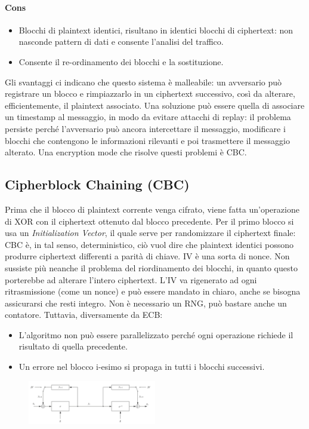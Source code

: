 \documentclass[a4paper,12pt]{article}
\begin{document}
\paragraph{Cons}
\begin{itemize}
	\item Blocchi di plaintext identici, risultano in identici blocchi di ciphertext: non nasconde pattern di dati e consente l'analisi del traffico.
	\item Consente il re-ordinamento dei blocchi e la sostituzione.
\end{itemize}
Gli svantaggi ci indicano che questo sistema è malleabile: un avversario può registrare un blocco e rimpiazzarlo in un ciphertext successivo, così da alterare, efficientemente, il plaintext associato.
Una soluzione può essere quella di associare un timestamp al messaggio, in modo da evitare attacchi di replay: il problema persiste perché l'avversario può ancora intercettare il messaggio, modificare i blocchi che contengono le informazioni rilevanti e poi trasmettere il messaggio alterato. Una encryption mode che risolve questi problemi è CBC.

\subsection{Cipherblock Chaining (CBC)}
Prima che il blocco di plaintext corrente venga cifrato, viene fatta un'operazione di XOR con il ciphertext ottenuto dal blocco precedente.
Per il primo blocco si usa un \textit{Initialization Vector}, il quale serve per randomizzare il ciphertext finale: CBC è, in tal senso, deterministico, ciò vuol dire che plaintext identici possono produrre ciphertext differenti a parità di chiave.
IV è una sorta di nonce. Non sussiste più neanche il problema del riordinamento dei blocchi, in quanto questo porterebbe ad alterare l'intero ciphertext. L'IV va rigenerato ad ogni ritrasmissione (come un nonce) e può essere mandato in chiaro, anche se bisogna assicurarsi che resti integro.
Non è necessario un RNG, può bastare anche un contatore. Tuttavia, diversamente da ECB:
\begin{itemize}
	\item L'algoritmo non può essere parallelizzato perché ogni operazione richiede il risultato di quella precedente.
	\item Un errore nel blocco i-esimo si propaga in tutti i blocchi successivi.
\end{itemize} 
\begin{figure}[H]
  \centering
  \includegraphics[width=0.5\textwidth]{img/cbc}
\end{figure}
\end{document}
